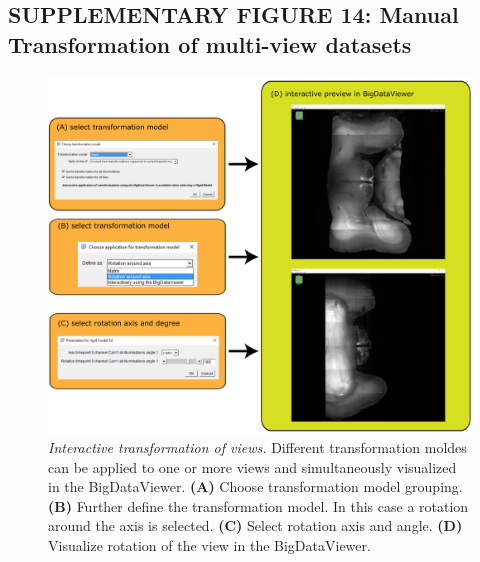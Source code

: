 \documentclass[]{spie}  %
\begin{document}
\subsection*{SUPPLEMENTARY FIGURE 14: Manual Transformation of multi-view datasets}
\vspace{1mm}
\begin{figure}[h!]
\includegraphics[width=\textwidth]{Supp-Transformation.png}
\vspace{-2.0mm}
\caption{\hspace{-0.5mm} \emph{Interactive transformation of views.} Different transformation moldes can be applied to one or more views and simultaneously visualized in the BigDataViewer. \textbf{(A)} Choose transformation model grouping. \textbf{(B)} Further define the transformation model. In this case a rotation around the axis is selected. \textbf{(C)} Select rotation axis and angle. \textbf{(D)} Visualize rotation of the view in the BigDataViewer.
}
\label{fig:sup-fig-manual-align2}
\end{figure}

\pagebreak
\end{document}
